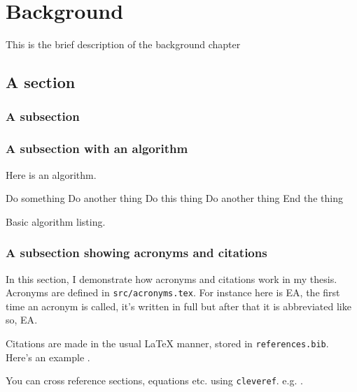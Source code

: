 \renewcommand{\BrainFuckChapter}{y}
\renewcommand{\LifeChapter}{y}
\chapter{Background}
\label{chap:background}
\chaptertoc{}

\begin{chapterabstract}
This is the brief description of the background chapter
\end{chapterabstract}

\section{A section}
\label{sec:bg_mri_physics}
\blindtext

\subsection{A subsection}
\label{sec:bg_nuclearmagnetism}
\blindmathpaper

\subsection{A subsection with an algorithm}
\label{sec:bg_algorithm}
Here is an algorithm.
\begin{algorithm}
  \begin{algorithmic}
    \State Do something
    \State Do another thing
    \State Do this thing
    \State Do another thing
    \EndWhile
    \State End the thing
  \end{algorithmic}
  \caption{Basic algorithm listing.}
  \label{alg:MC_random_walk}
\end{algorithm}

\subsection{A subsection showing acronyms and citations}
\label{sec:bg_acronyms}
In this section, I demonstrate how acronyms and citations work in my thesis. Acronyms are defined in \texttt{src/acronyms.tex}. For instance here is \ac{EA}, the first time an acronym is called, it's written in full but after that it is abbreviated like so, \ac{EA}.

Citations are made in the usual LaTeX manner, stored in \texttt{references.bib}. Here's an example \cite{ref1,ref2}.

You can cross reference sections, equations etc. using \texttt{cleveref}. e.g. .
